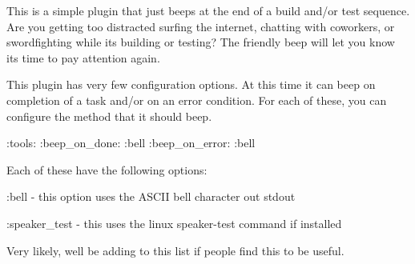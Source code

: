 This is a simple plugin that just beeps at the end of a build and/or test sequence. Are you getting too distracted surfing the internet, chatting with coworkers, or swordfighting while it\textquotesingle{}s building or testing? The friendly beep will let you know it\textquotesingle{}s time to pay attention again.

This plugin has very few configuration options. At this time it can beep on completion of a task and/or on an error condition. For each of these, you can configure the method that it should beep.


\begin{DoxyCode}
:tools:
  :beep\_on\_done: :bell
  :beep\_on\_error: :bell
\end{DoxyCode}


Each of these have the following options\+:


\begin{DoxyItemize}
\item \+:bell -\/ this option uses the A\+S\+C\+II bell character out stdout
\item \+:speaker\+\_\+test -\/ this uses the linux speaker-\/test command if installed
\end{DoxyItemize}

Very likely, we\textquotesingle{}ll be adding to this list if people find this to be useful. 